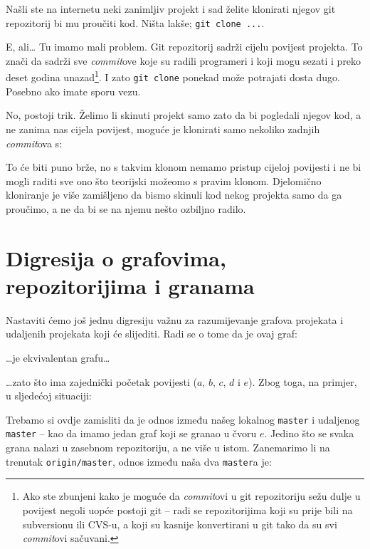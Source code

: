 Našli ste na internetu neki zanimljiv projekt i sad želite klonirati njegov git repozitorij bi mu proučiti kod. 
Ništa lakše; \verb+git clone ...+.

E, ali\dots
Tu imamo mali problem.
Git repozitorij sadrži cijelu povijest projekta. 
To znači da sadrži sve \emph{commit}ove koje su radili programeri i koji mogu sezati i preko deset godina unazad\footnote{Ako ste zbunjeni kako je moguće da \emph{commit}ovi u git repozitoriju sežu dulje u povijest negoli uopće postoji git -- radi se repozitorijima koji su prije bili na subversionu ili CVS-u, a koji su kasnije konvertirani u git tako da su svi \emph{commit}ovi sačuvani.}.
I zato \verb+git clone+ ponekad može potrajati dosta dugo. 
Posebno ako imate sporu vezu.

No, postoji trik.
Želimo li skinuti projekt samo zato da bi pogledali njegov kod, a ne zanima nas cijela povijest, moguće je klonirati samo nekoliko zadnjih \emph{commit}ova s:


To će biti puno brže, no s takvim klonom nemamo pristup cijeloj povijesti i ne bi mogli raditi sve ono što teorijski možeomo s pravim klonom. 
Djelomično kloniranje je više zamišljeno da bismo skinuli kod nekog projekta samo da ga proučimo, a ne da bi se na njemu nešto ozbiljno radilo.

\section*{Digresija o grafovima, repozitorijima i granama}

Nastaviti ćemo još jednu digresiju važnu za razumijevanje grafova projekata i udaljenih projekata koji će slijediti.
Radi se o tome da je ovaj graf:



\dots{}je ekvivalentan grafu\dots



\dots{}zato što ima zajednički početak povijesti ($a$, $b$, $c$, $d$ i $e$).
Zbog toga, na primjer, u sljedećoj situaciji:



Trebamo si ovdje zamisliti da je odnos između našeg lokalnog \verb+master+ i udaljenog \verb+master+ -- kao da imamo jedan graf koji se granao u čvoru $e$.
Jedino što se svaka grana nalazi u zasebnom repozitoriju, a ne više u istom.
Zanemarimo li na trenutak \verb+origin/master+, odnos između naša dva \verb+master+a je:

